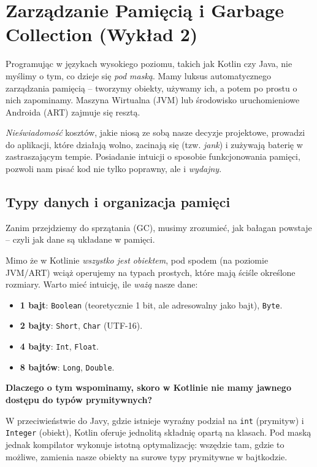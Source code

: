 \chapter{Zarządzanie Pamięcią i Garbage Collection (Wykład 2)}

Programując w językach wysokiego poziomu, takich jak Kotlin czy Java, nie myślimy o tym, co dzieje się \textit{pod maską}. Mamy luksus automatycznego zarządzania pamięcią – tworzymy obiekty, używamy ich, a potem po prostu o nich zapominamy. Maszyna Wirtualna (JVM) lub środowisko uruchomieniowe Androida (ART) zajmuje się resztą. 

\textit{Nieświadomość} kosztów, jakie niosą ze sobą nasze decyzje projektowe, prowadzi do aplikacji, które działają wolno, zacinają się (tzw. \textit{jank}) i zużywają baterię w zastraszającym tempie. Posiadanie intuicji o sposobie funkcjonowania pamięci, pozwoli nam pisać kod nie tylko poprawny, ale i \textit{wydajny}.

\section{Typy danych i organizacja pamięci}

Zanim przejdziemy do sprzątania (GC), musimy zrozumieć, jak bałagan powstaje – czyli jak dane są układane w pamięci.

Mimo że w Kotlinie \textit{wszystko jest obiektem}, pod spodem (na poziomie JVM/ART) wciąż operujemy na typach prostych, które mają ściśle określone rozmiary. Warto mieć intuicję, ile \textit{ważą} nasze dane:

\begin{itemize}
    \item \textbf{1 bajt}: \texttt{Boolean} (teoretycznie 1 bit, ale adresowalny jako bajt), \texttt{Byte}.
    \item \textbf{2 bajty}: \texttt{Short}, \texttt{Char} (UTF-16).
    \item \textbf{4 bajty}: \texttt{Int}, \texttt{Float}.
    \item \textbf{8 bajtów}: \texttt{Long}, \texttt{Double}.
\end{itemize}

\textbf{Dlaczego o tym wspominamy, skoro w Kotlinie nie mamy jawnego dostępu do typów prymitywnych?}

W przeciwieństwie do Javy, gdzie istnieje wyraźny podział na \texttt{int} (prymityw) i \texttt{Integer} (obiekt), Kotlin oferuje jednolitą składnię opartą na klasach. Pod maską jednak kompilator wykonuje istotną optymalizację: wszędzie tam, gdzie to możliwe, zamienia nasze obiekty na surowe typy prymitywne w bajtkodzie.

